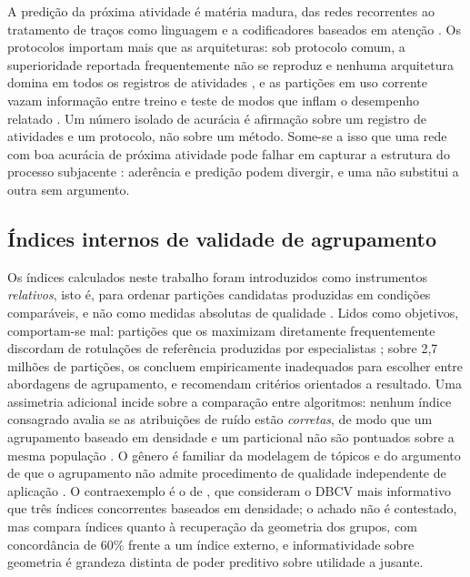 A predição da próxima atividade é matéria madura, das redes recorrentes \cite{tax2017lstm} ao
tratamento de traços como linguagem \cite{evermann2017predicting} e a codificadores baseados em
atenção \cite{bukhsh2021processtransformer}. Os protocolos importam mais que as arquiteturas: sob
protocolo comum, a superioridade reportada frequentemente não se reproduz e nenhuma arquitetura
domina em todos os registros de atividades \cite{ramamaneiro2023dlppm}, e as partições em uso corrente vazam informação
entre treino e teste de modos que inflam o desempenho relatado \cite{weytjens2022leakage}. Um número
isolado de acurácia é afirmação sobre um registro de atividades e um protocolo, não sobre um método. Some-se a isso que
uma rede com boa acurácia de próxima atividade pode falhar em capturar a estrutura do processo
subjacente \cite{peeperkorn2023rnnstructure}: aderência e predição podem divergir, e uma não
substitui a outra sem argumento.

\subsection{Índices internos de validade de agrupamento}
\label{sec:rev-indices}

Os índices calculados neste trabalho foram introduzidos como instrumentos \emph{relativos}, isto é,
para ordenar partições candidatas produzidas em condições comparáveis, e não como medidas absolutas
de qualidade \cite{rousseeuw1987silhouettes,daviesbouldin1979measure,calinski1974dendrite,
moulavi2014dbcv}. Lidos como objetivos, comportam-se mal: partições que os maximizam diretamente
frequentemente discordam de rotulações de referência produzidas por especialistas
\cite{gagolewski2021invalid}; sobre 2,7 milhões de partições,  os
concluem empiricamente inadequados para escolher entre abordagens de agrupamento, e recomendam
critérios orientados a resultado. Uma assimetria adicional incide sobre a comparação entre
algoritmos: nenhum índice consagrado avalia se as atribuições de ruído estão \emph{corretas}, de
modo que um agrupamento baseado em densidade e um particional não são pontuados sobre a mesma
população \cite{beer2026disco}. O gênero é familiar da modelagem de tópicos \cite{chang2009teahaves}
e do argumento de que o agrupamento não admite procedimento de qualidade independente de aplicação
\cite{vonluxburg2012clustering}. O contraexemplo é o de , que consideram
o DBCV mais informativo que três índices concorrentes baseados em densidade; o achado não é
contestado, mas compara índices quanto à recuperação da geometria dos grupos, com concordância de
60\% frente a um índice externo, e informatividade sobre geometria é grandeza distinta de poder
preditivo sobre utilidade a jusante.

